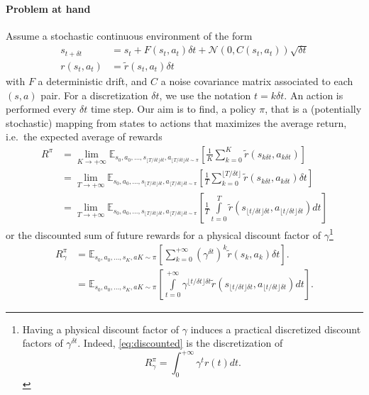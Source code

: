\documentclass[11pt]{article}
\newcommand{\deltat}{{\delta t}}
\newcommand{\gauss}{\mathcal{N}}
\newcommand{\E}{\mathbb{E}}
\begin{document}
\paragraph{Problem at hand}
Assume a stochastic continuous environment of the form
\begin{align}
	s_{t+\deltat} &= s_t + F(s_t, a_t) \deltat + \gauss(0, C(s_t, a_t)) \sqrt{\deltat}\\
	r(s_t, a_t) &= \tilde{r}(s_t, a_t) \deltat
\end{align}
with $F$ a deterministic drift, and $C$ a noise covariance matrix
associated to each $(s, a)$ pair. For a discretization $\deltat$, we use the notation $t = k \delta t$. An action is performed every $\deltat$ time step.
Our aim is to find, a policy $\pi$, that is a
(potentially stochastic) mapping from states to actions that maximizes the
average return, i.e.\ the expected average of rewards
\begin{align}
	R^\pi &= \lim\limits_{K\to+\infty}
	\E_{s_0, a_0, \ldots, s_{\lfloor T/\deltat\rfloor\deltat}, a_{\lfloor T/\deltat\rfloor\deltat\sim\pi}}\left[
		\frac{1}{K} \sum\limits_{k = 0}^K \tilde{r}(s_{k\deltat}, a_{k\deltat})
                \right] \\
              &= \lim\limits_{T\to+\infty}
	\E_{s_0, a_0, \ldots, s_{\lfloor T/\deltat\rfloor\deltat}, a_{\lfloor T/\deltat\rfloor\deltat\sim\pi}}\left[
		\frac{1}{T}\sum\limits_{k = 0}^{\lfloor T/\deltat\rfloor} \tilde{r}(s_{k\deltat}, a_{k\deltat})\deltat
                \right]\\
              &= \lim\limits_{T\to+\infty}	
	\E_{s_0, a_0, \ldots, s_{\lfloor T/\deltat\rfloor\deltat}, a_{\lfloor T/\deltat\rfloor\deltat\sim\pi}}\left[
		\frac{1}{T}\int\limits_{t = 0}^{T} \tilde{r}(s_{\lfloor t/\deltat\rfloor\deltat}, a_{\lfloor t/\deltat\rfloor\deltat})dt
	\right]
\end{align}
or the discounted sum of future rewards for a physical discount factor of $\gamma$\footnote{
	Having a physical discount factor of $\gamma$ induces a practical discretized discount
	factors of $\gamma^\deltat$. Indeed, \eqref{eq:discounted} is the discretization of
	\begin{equation}
		R^\pi_\gamma = \int_{0}^{+\infty} \gamma^{t} r(t) dt.
		\label{eq:discounted}
	\end{equation}
}
\begin{align}
	R^\pi_\gamma &= \E_{s_0, a_0, \ldots, s_K, aK \sim \pi}
	\left[
		\sum\limits_{k=0}^{+\infty}
		(\gamma^\deltat)^k \tilde{r}(s_k, a_k)\deltat 
                       \right].\\
                     &= \E_{s_0, a_0, \ldots, s_K, aK \sim \pi}
	\left[
		\int\limits_{t=0}^{+\infty}
		\gamma^{\lfloor t/\deltat\rfloor \deltat} \tilde{r}(s_{\lfloor t/\deltat\rfloor\deltat}, a_{\lfloor t/\deltat \rfloor\deltat})dt 
	\right].
\end{align}
\end{document}
